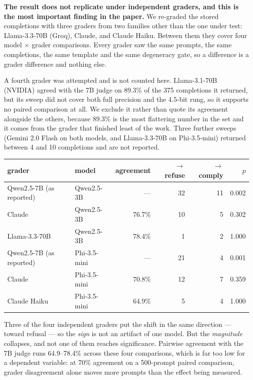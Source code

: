 \documentclass[11pt,a4paper]{article}
\newcommand{\tabfont}{\footnotesize}
\begin{document}
\begin{caveatbox}
\textbf{The result does not replicate under independent graders, and this is the
most important finding in the paper.} We re-graded the stored completions with
three graders from two families other than the one under test: Llama-3.3-70B
(Groq), Claude, and Claude Haiku. Between them they cover four model
$\times$ grader comparisons. Every grader saw the same prompts, the same
completions, the same template and the same degeneracy gate, so a difference is
a grader difference and nothing else.

A fourth grader was attempted and is not counted here. Llama-3.1-70B (NVIDIA)
agreed with the 7B judge on 89.3\% of the 375 completions it returned, but its
sweep did not cover both full precision and the 4.5-bit rung, so it supports no
paired comparison at all. We exclude it rather than quote its agreement
alongside the others, because 89.3\% is the most flattering number in the set and
it comes from the grader that finished least of the work. Three further sweeps
(Gemini 2.0 Flash on both models, and Llama-3.3-70B on Phi-3.5-mini) returned
between 4 and 10 completions and are not reported.

\begin{center}\tabfont
\begin{tabular}{llrrrr}
\toprule
grader & model & agreement & $\to$refuse & $\to$comply & $p$ \\
\midrule
Qwen2.5-7B (as reported) & Qwen2.5-3B   & ---   & 32 & 11 & 0.002 \\
Claude                   & Qwen2.5-3B   & 76.7\% & 10 &  5 & 0.302 \\
Llama-3.3-70B            & Qwen2.5-3B   & 78.4\% &  1 &  2 & 1.000 \\
\addlinespace
Qwen2.5-7B (as reported) & Phi-3.5-mini & ---   & 21 &  4 & 0.001 \\
Claude                   & Phi-3.5-mini & 70.8\% & 12 &  7 & 0.359 \\
Claude Haiku             & Phi-3.5-mini & 64.9\% &  5 &  4 & 1.000 \\
\bottomrule
\end{tabular}
\end{center}

Three of the four independent graders put the shift in the same direction ---
toward refusal --- so the \emph{sign} is not an artifact of one model. But the
\emph{magnitude} collapses, and not one of them reaches significance. Pairwise
agreement with the 7B judge runs 64.9--78.4\% across these four comparisons,
which is far too low for a dependent variable: at 70\% agreement on a 500-prompt
paired comparison, grader disagreement alone moves more prompts than the effect
being measured.


\end{caveatbox}
\end{document}
